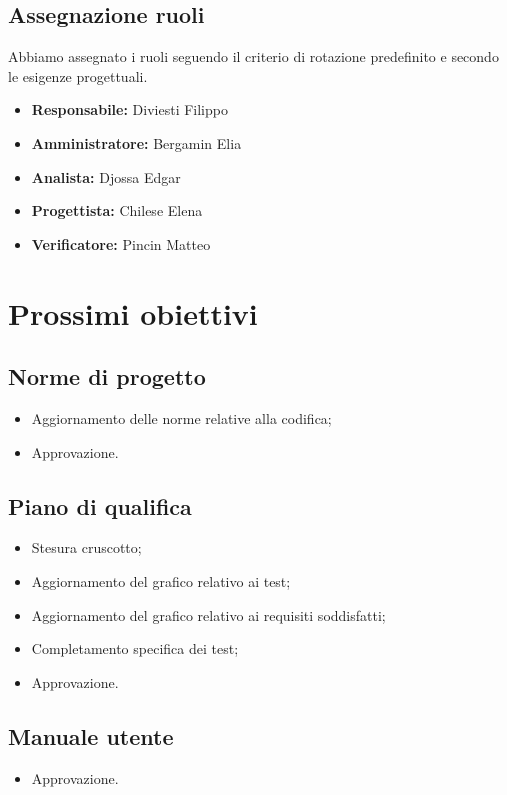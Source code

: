 \subsection{Assegnazione ruoli}
Abbiamo assegnato i ruoli seguendo il criterio di rotazione predefinito 
e secondo le esigenze progettuali.
\begin{itemize}
    \item \textbf{Responsabile:} Diviesti Filippo
    \item \textbf{Amministratore:} Bergamin Elia
    \item \textbf{Analista:} Djossa Edgar
    \item \textbf{Progettista:} Chilese Elena
    \item \textbf{Verificatore:} Pincin Matteo
\end{itemize}
\newpage

\section{Prossimi obiettivi}

\subsection{Norme di progetto}
\begin{itemize}
    \item Aggiornamento delle norme relative alla codifica;
    \item Approvazione.
\end{itemize}

\subsection{Piano di qualifica}
\begin{itemize}
    \item Stesura cruscotto;
    \item Aggiornamento del grafico relativo ai test;
    \item Aggiornamento del grafico relativo ai requisiti soddisfatti;
    \item Completamento specifica dei test;
    \item Approvazione.
\end{itemize}

\subsection{Manuale utente}
\begin{itemize}
    \item Approvazione.
\end{itemize}

